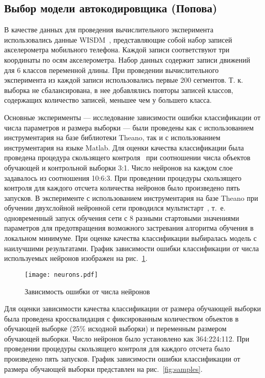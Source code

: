 \subsection{Выбор модели автокодировщика (Попова)}
В качестве данных для проведения вычислительного эксперимента использовались данные WISDM~\cite{wisdm}, представляющие собой набор записей акселерометра мобильного телефона. Каждой записи соответствуют три координаты по осям акселерометра. Набор данных содержит записи движений для 6 классов переменной длины.
При проведении вычислительного эксперимента из каждой записи использовались первые 200 сегментов. Т. к. выборка не сбалансирована, в нее добавлялись повторы записей классов, содержащих количество записей, меньшее чем у большего класса.

Основные эксперименты --- исследование зависимости ошибки классификации от числа параметров и размера выборки --- были проведены как с использованием инструментария на базе библиотеки Theano, так и с использованием инструментария на языке Matlab.
Для оценки качества классификации была проведена процедура скользящего контроля~\cite{cv} при соотношении числа объектов обучающей и контрольной выборки 3:1. Число нейронов на каждом слое задавалось из соотношения 10:6:3. При проведении процедуры скользящего контроля для каждого отсчета количества нейронов было произведено пять запусков. В эксперименте с использованием инструментария на базе Theano при обучении двухслойной нейронной сети проводился мультистарт~\cite{multi}, т.~е. одновременный запуск обучения сети с 8 разными стартовыми значениями параметров для предотвращения возможного застревания алгоритма обучения в локальном минимуме. При оценке качества классификации выбиралась модель с наилучшими результатами. График зависимости ошибки классификации от числа используемых нейронов изображен на рис.~\ref{fig:neurons}.


\begin{figure}[tb!]
 \centering
  \texttt{[image: neurons.pdf]}
 \caption{Зависимость ошибки от числа нейронов}
 \label{fig:neurons}
\end{figure}


Для оценки зависимости качества классификации от размера обучающей выборки была проведена кроссвалидация с фиксированным количеством объектов в обучающей выборке (25\% исходной выборки) и переменным размером обучающей выборки. Число нейронов было установлено как 364:224:112. При проведении процедуры скользящего контроля для каждого отсчета было произведено пять запусков. График зависимости ошибки классификации от размера обучающей выборки представлен на рис.~\ref{fig:samples}.


